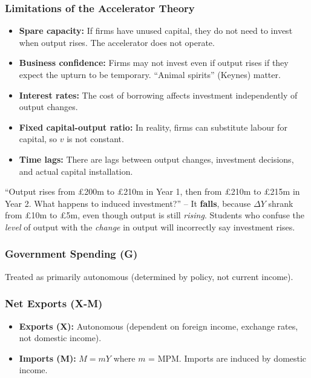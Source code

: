 \documentclass[11pt, a4paper, twoside]{book}
\begin{document}
\subsubsection{Limitations of the Accelerator Theory}

\begin{itemize}
  \item \textbf{Spare capacity:} If firms have unused capital, they do not need to invest when output rises. The accelerator does not operate.
  \item \textbf{Business confidence:} Firms may not invest even if output rises if they expect the upturn to be temporary. ``Animal spirits'' (Keynes) matter.
  \item \textbf{Interest rates:} The cost of borrowing affects investment independently of output changes.
  \item \textbf{Fixed capital-output ratio:} In reality, firms can substitute labour for capital, so $v$ is not constant.
  \item \textbf{Time lags:} There are lags between output changes, investment decisions, and actual capital installation.
\end{itemize}

\begin{example}
``Output rises from \pounds200m to \pounds210m in Year 1, then from \pounds210m to \pounds215m in Year 2. What happens to induced investment?'' -- It \textbf{falls}, because $\Delta Y$ shrank from \pounds10m to \pounds5m, even though output is still \emph{rising}. Students who confuse the \emph{level} of output with the \emph{change} in output will incorrectly say investment rises.
\end{example}

\subsubsection{Government Spending (G)}

Treated as primarily autonomous (determined by policy, not current income).

\subsubsection{Net Exports (X-M)}

\begin{itemize}
  \item \textbf{Exports (X):} Autonomous (dependent on foreign income, exchange rates, not domestic income).
  \item \textbf{Imports (M):} $M = mY$ where $m$ = MPM. Imports are induced by domestic income.
\end{itemize}
\end{document}
